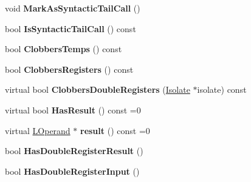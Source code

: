 \begin{DoxyCompactItemize}
\item 
void {\bfseries Mark\+As\+Syntactic\+Tail\+Call} ()\hypertarget{classv8_1_1internal_1_1_l_instruction_a72c62906028bed230decd2719d08a847}{}\label{classv8_1_1internal_1_1_l_instruction_a72c62906028bed230decd2719d08a847}

\item 
bool {\bfseries Is\+Syntactic\+Tail\+Call} () const \hypertarget{classv8_1_1internal_1_1_l_instruction_a2f5419706e2dbe5ab9cc774e3c2816c0}{}\label{classv8_1_1internal_1_1_l_instruction_a2f5419706e2dbe5ab9cc774e3c2816c0}

\item 
bool {\bfseries Clobbers\+Temps} () const \hypertarget{classv8_1_1internal_1_1_l_instruction_ae0d7f1fe3d3d67357050ddb2cd539d62}{}\label{classv8_1_1internal_1_1_l_instruction_ae0d7f1fe3d3d67357050ddb2cd539d62}

\item 
bool {\bfseries Clobbers\+Registers} () const \hypertarget{classv8_1_1internal_1_1_l_instruction_a1be40eb2a9feb7da6047a05f41e6fb5c}{}\label{classv8_1_1internal_1_1_l_instruction_a1be40eb2a9feb7da6047a05f41e6fb5c}

\item 
virtual bool {\bfseries Clobbers\+Double\+Registers} (\hyperlink{classv8_1_1internal_1_1_isolate}{Isolate} $\ast$isolate) const \hypertarget{classv8_1_1internal_1_1_l_instruction_acbdd958e836acbc67e53ae3de2b17149}{}\label{classv8_1_1internal_1_1_l_instruction_acbdd958e836acbc67e53ae3de2b17149}

\item 
virtual bool {\bfseries Has\+Result} () const  =0\hypertarget{classv8_1_1internal_1_1_l_instruction_af38ca7b40171f2ed75a2970ac7e15fd8}{}\label{classv8_1_1internal_1_1_l_instruction_af38ca7b40171f2ed75a2970ac7e15fd8}

\item 
virtual \hyperlink{classv8_1_1internal_1_1_l_operand}{L\+Operand} $\ast$ {\bfseries result} () const  =0\hypertarget{classv8_1_1internal_1_1_l_instruction_a3c5b856bb92c72dabcf08086abf6f8d7}{}\label{classv8_1_1internal_1_1_l_instruction_a3c5b856bb92c72dabcf08086abf6f8d7}

\item 
bool {\bfseries Has\+Double\+Register\+Result} ()\hypertarget{classv8_1_1internal_1_1_l_instruction_a543f5e4ff99e3d1ba02cb23ecb322de1}{}\label{classv8_1_1internal_1_1_l_instruction_a543f5e4ff99e3d1ba02cb23ecb322de1}

\item 
bool {\bfseries Has\+Double\+Register\+Input} ()\hypertarget{classv8_1_1internal_1_1_l_instruction_a24667d3c56cea0353d051a19753bb71c}{}\label{classv8_1_1internal_1_1_l_instruction_a24667d3c56cea0353d051a19753bb71c}


\end{DoxyCompactItemize}
